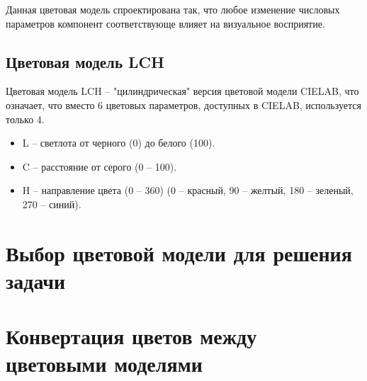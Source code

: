 \documentclass[a4paper,14pt, unknownkeysallowed]{extreport}
\begin{document}
    Данная цветовая модель спроектирована так, что любое изменение числовых параметров компонент соответствующе влияет на визуальное восприятие.

    \subsection{Цветовая модель LCH}

    Цветовая модель LCH – "цилиндрическая" версия цветовой модели CIELAB, что означает, что вместо 6 цветовых параметров, доступных в CIELAB, используется только 4.

    \begin{itemize}
        \item L – светлота от черного (0) до белого (100).
        \item C – расстояние от серого (0 – 100).
        \item H – направление цвета (0 – 360) (0 – красный, 90 – желтый, 180 – зеленый, 270 – синий).
    \end{itemize}

    \section{Выбор цветовой модели для решения задачи}


    \section{Конвертация цветов между цветовыми моделями}
    \label{sec:models_conerting}
\end{document}
